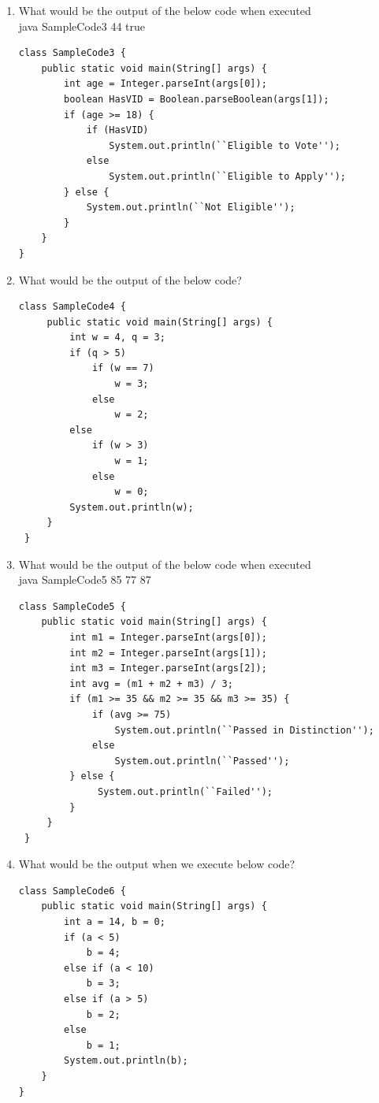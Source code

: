 \documentclass[11pt,a4paper]{article}
\def\AnswerBox{\fbox{\begin{minipage}{4in}\hfill\vspace{0.5in}\end{minipage}}}
\begin{document}
\begin{enumerate}
\item What would be the output of the below code when executed\\
    java SampleCode3 44 true
\begin{lstlisting}
class SampleCode3 {
    public static void main(String[] args) {
        int age = Integer.parseInt(args[0]);
        boolean HasVID = Boolean.parseBoolean(args[1]);
        if (age >= 18) {
            if (HasVID)
                System.out.println(``Eligible to Vote'');
            else
                System.out.println(``Eligible to Apply'');
        } else {
            System.out.println(``Not Eligible'');
        }
    }
}
\end{lstlisting}
\AnswerBox
\item What would be the output of the below code?
\begin{lstlisting}
class SampleCode4 {
     public static void main(String[] args) {
         int w = 4, q = 3;
         if (q > 5)
             if (w == 7)
                 w = 3;
             else
                 w = 2;
         else
             if (w > 3)
                 w = 1;
             else
                 w = 0;
         System.out.println(w);
     }
 }
\end{lstlisting}
\AnswerBox

\item What would be the output of the below code when executed\\
    java SampleCode5 85 77 87
\begin{lstlisting}
class SampleCode5 {
    public static void main(String[] args) {
         int m1 = Integer.parseInt(args[0]);
         int m2 = Integer.parseInt(args[1]);
         int m3 = Integer.parseInt(args[2]);
         int avg = (m1 + m2 + m3) / 3;
         if (m1 >= 35 && m2 >= 35 && m3 >= 35) {
             if (avg >= 75)
                 System.out.println(``Passed in Distinction'');
             else
                 System.out.println(``Passed'');
         } else {
              System.out.println(``Failed'');
         }
     }
 }
\end{lstlisting}
\AnswerBox

\item What would be the output when we execute below code?
\begin{lstlisting}
class SampleCode6 {
    public static void main(String[] args) {
        int a = 14, b = 0;
        if (a < 5)
            b = 4;
        else if (a < 10)
            b = 3;
        else if (a > 5)
            b = 2;
        else
            b = 1;
        System.out.println(b);
    }
}
\end{lstlisting}
\AnswerBox


\end{enumerate}
\end{document}
